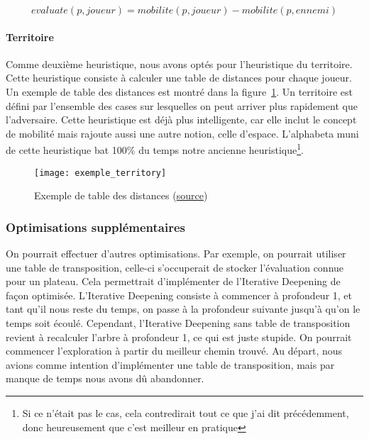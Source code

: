 \begin{equation}
	evaluate(p, joueur) = mobilite(p, joueur) - mobilite(p, ennemi)
	\label{eq:mobility-heuristic}
\end{equation}

\paragraph{Territoire}
Comme deuxième heuristique, nous avons optés pour l'heuristique du territoire.
Cette heuristique consiste à calculer une table de distances pour chaque joueur.
Un exemple de table des distances est montré dans la figure~\ref{fig:exemple-territoire}.
Un territoire est défini par l'ensemble des cases sur lesquelles on peut arriver plus rapidement
que l'adversaire. Cette heuristique est déjà plus intelligente, car elle inclut le concept de mobilité mais
rajoute aussi une autre notion, celle d'espace. L'alphabeta muni de cette heuristique bat
100\% du temps notre ancienne heuristique\footnote{Si ce n'était pas le cas, cela contredirait tout ce que j'ai dit précédemment, donc heureusement que c'est meilleur en pratique}.

\begin{figure}[H]
	\centering
	\texttt{[image: exemple\_territory]}
	\caption{Exemple de table des distances (\href{https://core.ac.uk/download/pdf/81108035.pdf}{source})}
	\label{fig:exemple-territoire}
\end{figure}
\subsubsection{Optimisations supplémentaires}
On pourrait effectuer d'autres optimisations. Par exemple, on pourrait utiliser
une table de transposition, celle-ci s'occuperait de stocker l'évaluation connue pour un plateau.
Cela permettrait d'implémenter de l'Iterative Deepening de façon optimisée. L'Iterative Deepening consiste
à commencer à profondeur 1, et tant qu'il nous reste du temps, on passe à la profondeur suivante jusqu'à qu'on le temps soit écoulé.
Cependant, l'Iterative Deepening sans table de transposition revient à recalculer l'arbre à profondeur 1, ce qui est juste stupide. On pourrait
commencer l'exploration à partir du meilleur chemin trouvé. Au départ, nous avions comme intention
d'implémenter une table de transposition, mais par manque de temps nous avons dû abandonner.
